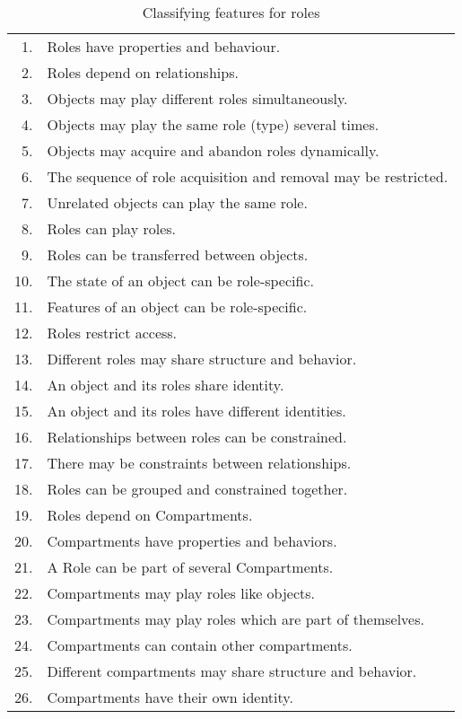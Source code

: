 \begin{table}[t]
  \caption{Classifying features for roles}
  \small
  \centering
  \begin{tabularx}{0.8\linewidth}{rX} 
    \toprule
    1.  & Roles have properties and behaviour.\\
    2.  & Roles depend on relationships.\\
    3.  & Objects may play different roles simultaneously.\\
    4.  & Objects may play the same role (type) several times.\\
    5.  & Objects may acquire and abandon roles dynamically.\\
    6.  & The sequence of role acquisition and removal may be restricted.\\
    7.  & Unrelated objects can play the same role.\\
    8.  & Roles can play roles.\\
    9.  & Roles can be transferred between objects.\\
    10. & The state of an object can be role-specific.\\
    11. & Features of an object can be role-specific.\\
    12. & Roles restrict access.\\
    13. & Different roles may share structure and behavior.\\
    14. & An object and its roles share identity.\\
    15. & An object and its roles have different identities.\\
    \midrule
    16. & Relationships between roles can be constrained.\\
    17. & There may be constraints between relationships.\\
    18. & Roles can be grouped and constrained together.\\
    19. & Roles depend on Compartments.\\
    20. & Compartments have properties and behaviors.\\
    21. & A Role can be part of several Compartments.\\
    22. & Compartments may play roles like objects.\\
    23. & Compartments may play roles which are part of themselves.\\
    24. & Compartments can contain other compartments.\\
    25. & Different compartments may share structure and behavior.\\
    26. & Compartments have their own identity.\\
    \bottomrule
  \end{tabularx}
  \label{tab:role-features}
\end{table}


